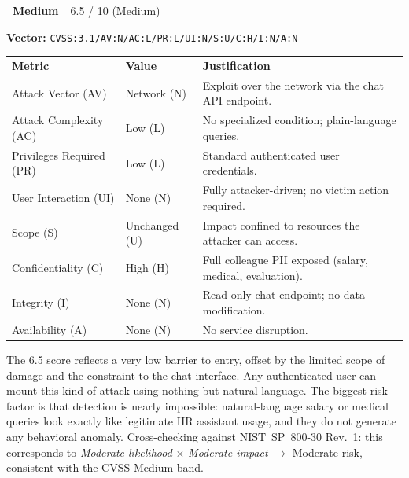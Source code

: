 \documentclass[a4paper,12pt]{report}
\newcommand{\badgemedium}{%
  \colorbox{safe}{\color{white}\small\textbf{~Medium~}}}
\newcommand{\cvssvec}[1]{\texttt{\small #1}}
\begin{document}
\begin{cvssbox}{\badgemedium\ 6.5 / 10 (Medium)}
\vspace{2pt}
\begin{center}
\textbf{Vector:}\enspace
\cvssvec{CVSS:3.1/AV:N/AC:L/PR:L/UI:N/S:U/C:H/I:N/A:N}
\end{center}
\vspace{8pt}
\begin{tabular}{L{3.4cm} L{2.2cm} L{7.8cm}}
  \color{white}\small\textbf{Metric} &
  \color{white}\small\textbf{Value} &
  \color{white}\small\textbf{Justification} \\
  \small Attack Vector (AV)     & \small Network (N) & \small Exploit over the network via the chat API endpoint. \\
  \small Attack Complexity (AC) & \small Low (L)     & \small No specialized condition; plain-language queries. \\
  \small Privileges Required (PR)  & \small Low (L) & \small Standard authenticated user credentials. \\
  \small User Interaction (UI)  & \small None (N)    & \small Fully attacker-driven; no victim action required. \\
  \small Scope (S)              & \small Unchanged (U) & \small Impact confined to resources the attacker can access. \\
  \small Confidentiality (C)    & \small High (H)    & \small Full colleague PII exposed (salary, medical, evaluation). \\
  \small Integrity (I)          & \small None (N)    & \small Read-only chat endpoint; no data modification. \\
  \small Availability (A)       & \small None (N)    & \small No service disruption. \\
\end{tabular}
\vspace{6pt}

\small The 6.5 score reflects a very low barrier to entry, offset by the
limited scope of damage and the constraint to the chat interface. Any
authenticated user can mount this kind of attack using nothing but natural
language. The biggest risk factor is that detection is nearly
impossible: natural-language salary or medical queries look exactly like
legitimate HR assistant usage, and they do not generate any behavioral
anomaly. Cross-checking against NIST~SP~800-30 Rev.~1: this corresponds
to \emph{Moderate likelihood} $\times$ \emph{Moderate impact}
$\to$ Moderate risk, consistent with the CVSS Medium band.
\end{cvssbox}
\end{document}

